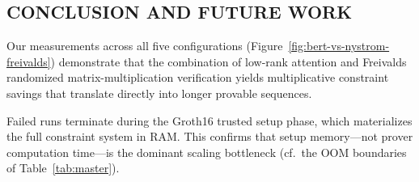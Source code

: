 \documentclass[sigconf,anonymous,review,balance=false]{acmart}
\newcommand{\rev}[1]{{\color{magenta}#1}}
\begin{document}

\subsection{CONCLUSION AND FUTURE WORK}
\label{subsec:discussion}
 Our measurements across all five configurations (Figure~\ref{fig:bert-vs-nystrom-freivalds}) demonstrate that the combination of \nystrom low-rank attention and Freivalds randomized matrix-multiplication verification yields multiplicative constraint savings that translate directly into longer provable sequences. %

 Failed runs terminate during the Groth16 trusted setup phase, which materializes the full constraint system in RAM. \rev{This confirms that setup memory---not prover computation time---is the dominant scaling bottleneck (cf.\ the OOM boundaries of Table~\ref{tab:master}).}
\end{document}
